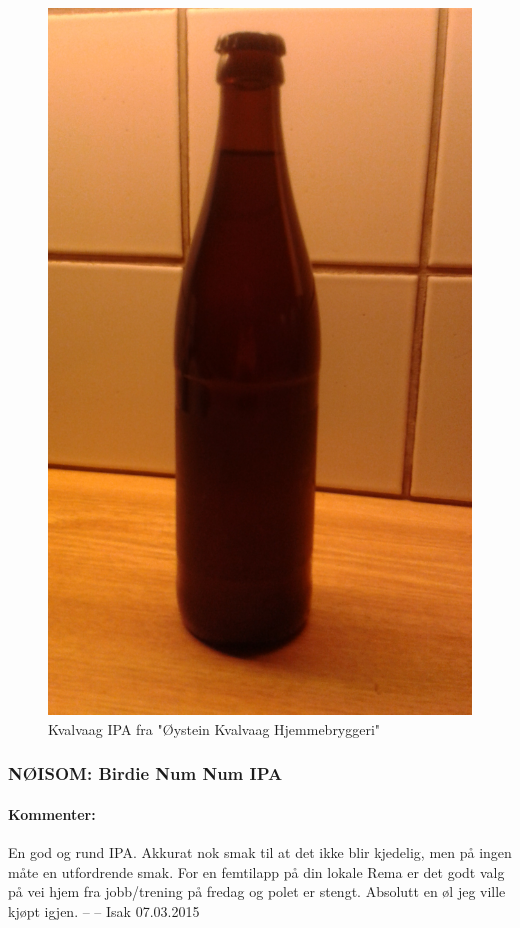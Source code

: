 \documentclass[12pt,a4paper,oneside,norsk]{article}
\begin{document}
\begin{figure} [H]
\centering
\includegraphics[scale=0.1, angle=270]{Bilder/Ol/KvalvaagIPA}
\caption{Kvalvaag IPA fra "Øystein Kvalvaag Hjemmebryggeri"}
\end{figure}

\newpage
\subsubsection{NØISOM: Birdie Num Num IPA}
\paragraph{Kommenter:} En god og rund IPA. Akkurat nok smak til at det ikke blir kjedelig, men på ingen måte en utfordrende smak. For en femtilapp på din lokale Rema er det godt valg på vei hjem fra jobb/trening på fredag og polet er stengt. Absolutt en øl jeg ville kjøpt igjen.   
\newline
-- -- Isak 07.03.2015
\end{document}
